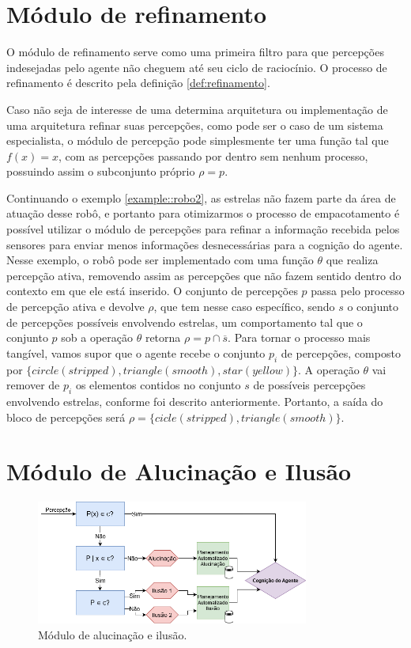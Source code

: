 \section{Módulo de refinamento}

O módulo de refinamento serve como uma primeira filtro para que percepções indesejadas pelo agente não cheguem até seu ciclo de raciocínio. O processo de refinamento é descrito pela definição \ref{def:refinamento}.

Caso não seja de interesse de uma determina arquitetura ou implementação de uma arquitetura refinar suas percepções, como pode ser o caso de um sistema especialista, o módulo de percepção pode simplesmente ter uma função tal que $f(x) = x$, com as percepções passando por dentro sem nenhum processo, possuindo assim o subconjunto próprio $\rho = p$.

\begin{example}
    Continuando o exemplo \ref{example::robo2}, as estrelas não fazem parte da área de atuação desse robô, e portanto para otimizarmos o processo de empacotamento é possível utilizar o módulo de percepções para refinar a informação recebida pelos sensores para enviar menos informações desnecessárias para a cognição do agente. Nesse exemplo, o robô pode ser implementado com uma função $\theta$ que realiza percepção ativa, removendo assim as percepções que não fazem sentido dentro do contexto em que ele está inserido. O conjunto de percepções $p$ passa pelo processo de percepção ativa e devolve $\rho$, que tem nesse caso específico, sendo $s$ o conjunto de percepções possíveis envolvendo estrelas, um comportamento tal que o conjunto $p$ sob a operação $\theta$ retorna $\rho = p \cap \overline{s}$. 
    Para tornar o processo mais tangível, vamos supor que o agente recebe o conjunto $p_i$ de percepções, composto por $\{circle(stripped), triangle(smooth), star(yellow)\}$. A operação $\theta$ vai remover de $p_i$ os elementos contidos no conjunto $s$ de possíveis percepções envolvendo estrelas, conforme foi descrito anteriormente. Portanto, a saída do bloco de percepções será $\rho = \{cicle(stripped), triangle(smooth)\}$.
    
\end{example}{}

\section{Módulo de Alucinação e Ilusão}

\begin{figure}[h]
    \centering
    \includegraphics[width=0.8\textwidth]{Images/diagrama-modelo.png}
    \caption{Módulo de alucinação e ilusão.}
    \label{fig:model}
\end{figure}
 
